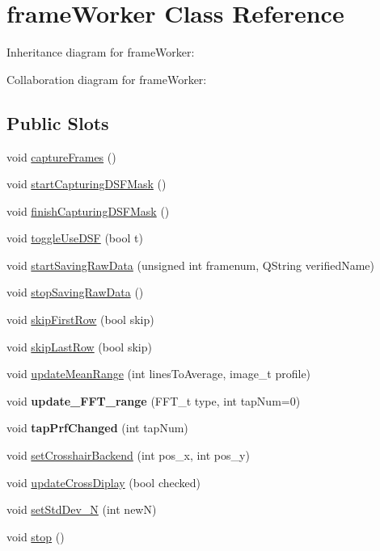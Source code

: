 \hypertarget{classframeWorker}{\section{frame\+Worker Class Reference}
\label{classframeWorker}
}


Inheritance diagram for frame\+Worker\+:


Collaboration diagram for frame\+Worker\+:
\subsection*{Public Slots}
\begin{DoxyCompactItemize}
\item 
void \hyperlink{group__renderfunc_gadba11cf8b60c455d857f8400fee7ca7d}{capture\+Frames} ()
\item 
void \hyperlink{group__maskfunc_ga491bd33995f96dc7ba226385af68fcde}{start\+Capturing\+D\+S\+F\+Mask} ()
\item 
void \hyperlink{group__maskfunc_gabb47faca8ced962d58dd3e155944405c}{finish\+Capturing\+D\+S\+F\+Mask} ()
\item 
void \hyperlink{group__maskfunc_ga0c60552b1b0aedbfd7091ce71a16c718}{toggle\+Use\+D\+S\+F} (bool t)
\item 
void \hyperlink{group__savingfunc_ga3b93022717727f137956e74db96090b2}{start\+Saving\+Raw\+Data} (unsigned int framenum, Q\+String verified\+Name)
\item 
void \hyperlink{group__savingfunc_ga0bc169f3c9b7144eca0409d78a8698fa}{stop\+Saving\+Raw\+Data} ()
\item 
void \hyperlink{classframeWorker_a47846c824a232e83fb14b5619957bcba}{skip\+First\+Row} (bool skip)
\item 
void \hyperlink{classframeWorker_abe9de2a81eb692d11998f60e4058f5b8}{skip\+Last\+Row} (bool skip)
\item 
void \hyperlink{classframeWorker_ae69ad875e1383b1bdde2b27dea185c2e}{update\+Mean\+Range} (int lines\+To\+Average, image\+\_\+t profile)
\item 
\hypertarget{classframeWorker_a3f4a350d514984941f05944339a46086}{void {\bfseries update\+\_\+\+F\+F\+T\+\_\+range} (F\+F\+T\+\_\+t type, int tap\+Num=0)}\label{classframeWorker_a3f4a350d514984941f05944339a46086}

\item 
\hypertarget{classframeWorker_ad58eb08aa59eca1231032df8e8fccb78}{void {\bfseries tap\+Prf\+Changed} (int tap\+Num)}\label{classframeWorker_ad58eb08aa59eca1231032df8e8fccb78}

\item 
void \hyperlink{classframeWorker_ab337c05c334bc311d3d7300dc64c59d2}{set\+Crosshair\+Backend} (int pos\+\_\+x, int pos\+\_\+y)
\item 
void \hyperlink{classframeWorker_a708fee8143c541114a5e1c2ccda83887}{update\+Cross\+Diplay} (bool checked)
\item 
void \hyperlink{classframeWorker_a65002170252d83e9ba5fb80979f1501c}{set\+Std\+Dev\+\_\+\+N} (int new\+N)
\item 
void \hyperlink{classframeWorker_af344ae781877ed9744a9c71223f3b9a9}{stop} ()
\end{DoxyCompactItemize}
